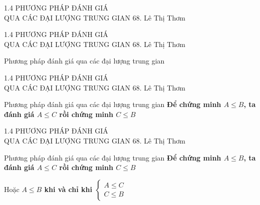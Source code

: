 \begin{frame}{1.4 PHƯƠNG PHÁP ĐÁNH GIÁ\\ QUA CÁC ĐẠI LƯỢNG TRUNG GIAN \hspace{3cm}  68. Lê Thị Thơm} 

\end{frame} 
\begin{frame}{1.4 PHƯƠNG PHÁP ĐÁNH GIÁ\\ QUA CÁC ĐẠI LƯỢNG TRUNG GIAN \hspace{3cm}  68. Lê Thị Thơm} 
\begin{block}{Phương pháp đánh giá qua các đại lượng trung gian }

\end{block}
\end{frame} 

\begin{frame}{1.4 PHƯƠNG PHÁP ĐÁNH GIÁ\\ QUA CÁC ĐẠI LƯỢNG TRUNG GIAN \hspace{3cm}  68. Lê Thị Thơm} 
\begin{block}{Phương pháp đánh giá qua các đại lượng trung gian }
\textbf{ Để chứng minh $ A \leq B$, ta đánh giá $A\leq C$ rồi chứng minh $C \leq B$ }

\end{block} 

\end{frame} 

\begin{frame}{1.4 PHƯƠNG PHÁP ĐÁNH GIÁ\\ QUA CÁC ĐẠI LƯỢNG TRUNG GIAN \hspace{3cm}  68. Lê Thị Thơm} 
\begin{block}{Phương pháp đánh giá qua các đại lượng trung gian }
\textbf{ Để chứng minh $ A \leq B$, ta đánh giá $A\leq C$ rồi chứng minh $C \leq B$ }

\end{block} 
\begin{block}{Hoặc}
\textbf{  $A \leq B $  khi và chỉ khi 
                $\begin{cases}
		 	A \leq  C  \\
		 	C \leq  B 
		 	\end{cases}$    \\}
\end{block}
\end{frame}

